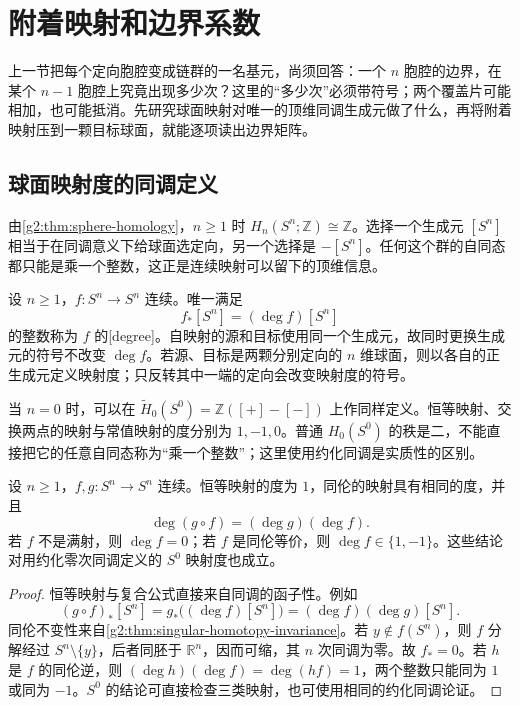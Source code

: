 
% 
% 

\section{附着映射和边界系数}
\label{g2:sec:0302}

上一节把每个定向胞腔变成链群的一名基元，尚须回答：一个 \(n\) 胞腔的边界，在某个 \(n-1\) 胞腔上究竟出现多少次？这里的“多少次”必须带符号；两个覆盖片可能相加，也可能抵消。先研究球面映射对唯一的顶维同调生成元做了什么，再将附着映射压到一颗目标球面，就能逐项读出边界矩阵。

\subsection{球面映射度的同调定义}
\label{g2:subsec:0302:01}

由\cref{g2:thm:sphere-homology}，\(n\ge1\) 时 \(H_n(S^n;\mathbb Z)\cong\mathbb Z\)。选择一个生成元 \([S^n]\) 相当于在同调意义下给球面选定向，另一个选择是 \(-[S^n]\)。任何这个群的自同态都只能是乘一个整数，这正是连续映射可以留下的顶维信息。

\begin{definition}[球面映射度]\label{g2:def:sphere-degree}
	设 \(n\ge1\)，\(f:S^n\rightarrow S^n\) 连续。唯一满足
	\[
		f_*[S^n]=(\deg f)[S^n]
	\]
	的整数称为 \(f\) 的[degree]。自映射的源和目标使用同一个生成元，故同时更换生成元的符号不改变 \(\deg f\)。若源、目标是两颗分别定向的 \(n\) 维球面，则以各自的正生成元定义映射度；只反转其中一端的定向会改变映射度的符号。
\end{definition}

当 \(n=0\) 时，可以在 \(\widetilde H_0(S^0)=\mathbb Z([+]-[-])\) 上作同样定义。恒等映射、交换两点的映射与常值映射的度分别为 \(1,-1,0\)。普通 \(H_0(S^0)\) 的秩是二，不能直接把它的任意自同态称为“乘一个整数”；这里使用约化同调是实质性的区别。

\begin{proposition}\label{g2:prop:degree-basic}
	设 \(n\ge1\)，\(f,g:S^n\rightarrow S^n\) 连续。恒等映射的度为 \(1\)，同伦的映射具有相同的度，并且
	\[
		\deg(g\circ f)=(\deg g)(\deg f).
	\]
	若 \(f\) 不是满射，则 \(\deg f=0\)；若 \(f\) 是同伦等价，则 \(\deg f\in\{1,-1\}\)。这些结论对用约化零次同调定义的 \(S^0\) 映射度也成立。
\end{proposition}
\begin{proof}
	恒等映射与复合公式直接来自同调的函子性。例如
	\[
		(g\circ f)_*[S^n]=g_*\bigl((\deg f)[S^n]\bigr)
		=(\deg f)(\deg g)[S^n].
	\]
	同伦不变性来自\cref{g2:thm:singular-homotopy-invariance}。若 \(y\notin f(S^n)\)，则 \(f\) 分解经过 \(S^n\setminus\{y\}\)，后者同胚于 \(\mathbb R^n\)，因而可缩，其 \(n\) 次同调为零。故 \(f_*=0\)。若 \(h\) 是 \(f\) 的同伦逆，则 \((\deg h)(\deg f)=\deg(hf)=1\)，两个整数只能同为 \(1\) 或同为 \(-1\)。\(S^0\) 的结论可直接检查三类映射，也可使用相同的约化同调论证。
\end{proof}

